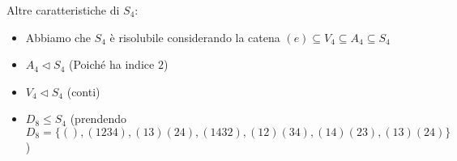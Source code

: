 \documentclass[a4paper,NoNotes,GeneralMath]{stdmdoc}
\newcommand{\sgr}{\le}
\newcommand{\nrm}{\lhd}
\begin{document}
	Altre caratteristiche di $S_4$:
	\begin{itemize}
		\item Abbiamo che $S_4$ è risolubile considerando la catena $(e) \subseteq V_4 \subseteq A_4 \subseteq S_4$
		\item $A_4 \nrm S_4$ (Poiché ha indice $2$)
		\item $V_4 \nrm S_4$ (conti)
		\item $D_8 \sgr S_4$ (prendendo $D_8 = \{(), (1234), (13)(24), (1432), (12)(34), (14)(23), (13)(24)\}$)
	\end{itemize}
\end{document}
